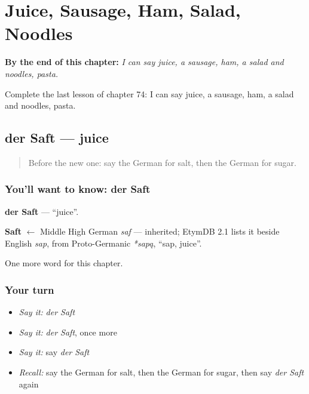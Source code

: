 
\chapter{Juice, Sausage, Ham, Salad, Noodles}
\label{ch:ge-juice-sausage-ham-salad-noodles}

\begin{chapteropening}
\textbf{By the end of this chapter:} \emph{I can say juice, a sausage, ham, a salad and noodles, pasta.}

Complete the last lesson of chapter 74: I can say juice, a sausage, ham, a salad and noodles, pasta.
\end{chapteropening}

\section[der Saft]{der Saft — juice}

\label{lesson:GE-C74-saft}



\begin{quote}
Before the new one: say the German for salt, then the German for sugar.
\end{quote}

\subsection*{You'll want to know: der Saft}
\textbf{der Saft} — \textquotedblleft{}juice\textquotedblright{}.

\begin{cousinweb}
\textbf{Saft} $\leftarrow$ Middle High German \emph{saf} — inherited; EtymDB 2.1 lists it beside English \emph{sap}, from Proto-Germanic \emph{*sapą}, \textquotedblleft{}sap, juice\textquotedblright{}.
\end{cousinweb}

\begin{grammarlens}[title={What you've built}]
One more word for this chapter.
\end{grammarlens}

\subsection*{Your turn}
\begin{itemize}
\raggedright
  \item \emph{Say it:} \emph{der Saft}
  \item \emph{Say it:} \emph{der Saft}, once more
  \item \emph{Say it:} say \emph{der Saft}
  \item \emph{Recall:} say the German for salt, then the German for sugar, then say \emph{der Saft} again
\end{itemize}

